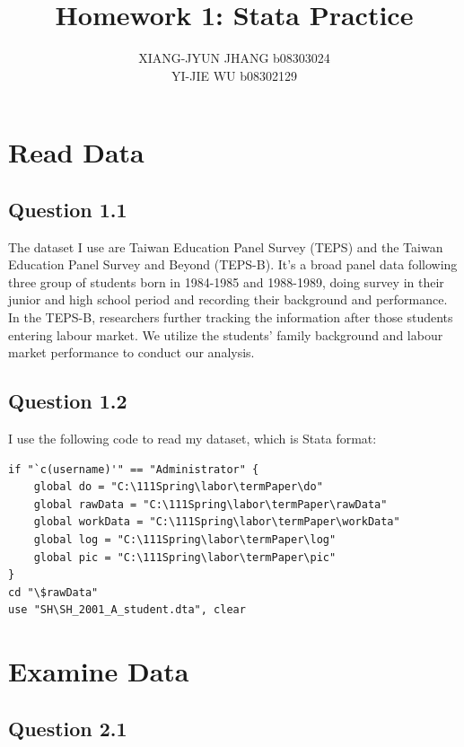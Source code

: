 \documentclass[11pt, letterpaper]{article}
\title{Homework 1: Stata Practice}
\author{XIANG-JYUN JHANG b08303024 \\ YI-JIE WU b08302129}
\begin{document}
\maketitle



\section{Read Data}


\subsection*{Question 1.1}

The dataset I use are Taiwan Education Panel Survey (TEPS) and the Taiwan Education Panel Survey and Beyond (TEPS-B).  It's a broad panel data following three group of students born in 1984-1985 and 1988-1989, doing survey in their junior and high school period and recording their background and performance.  In the TEPS-B, researchers further tracking the information after those students entering labour market.  We utilize the students' family background and labour market performance to conduct our analysis. 


\subsection*{Question 1.2}

I use the following code to read my dataset, which is Stata format:

\begin{lstlisting}
if "`c(username)'" == "Administrator" {  
    global do = "C:\111Spring\labor\termPaper\do"
    global rawData = "C:\111Spring\labor\termPaper\rawData"
    global workData = "C:\111Spring\labor\termPaper\workData"
    global log = "C:\111Spring\labor\termPaper\log"
    global pic = "C:\111Spring\labor\termPaper\pic"
}
cd "\$rawData" 
use "SH\SH_2001_A_student.dta", clear
\end{lstlisting}


\section{Examine Data}


\subsection*{Question 2.1}
\end{document}
